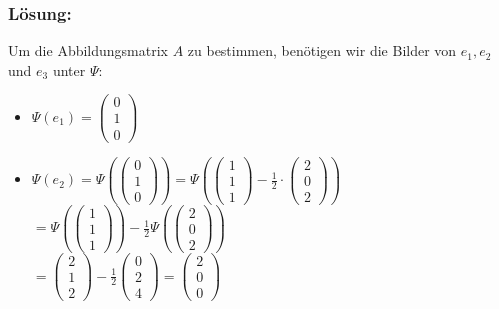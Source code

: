 \begin{frame}\frametitle{Lösung:}
%
Um die Abbildungsmatrix $A$ zu bestimmen, benötigen wir die Bilder von $e_1,e_2$ und $e_3$ unter $\Psi$:

\begin{itemize}

\item $\Psi(e_1)=\begin{pmatrix} 0 \\ 1 \\ 0\end{pmatrix}$
	
\item $\Psi(e_2)=\Psi(\begin{pmatrix} 0 \\ 1\\0\end{pmatrix})=\Psi(\begin{pmatrix}1\\1\\1 \end{pmatrix}-\frac{1}{2}\cdot \begin{pmatrix} 2\\0\\2\end{pmatrix})$\\\hspace{10,5mm}$=\Psi(\begin{pmatrix}1\\1\\1 \end{pmatrix})-\frac{1}{2}\Psi(\begin{pmatrix} 2\\0\\2\end{pmatrix})$\\\hspace{10,5mm}$=\begin{pmatrix}2 \\ 1 \\ 2 \end{pmatrix}-\frac{1}{2} \begin{pmatrix}0\\2\\4 \end{pmatrix}= \begin{pmatrix}2\\0\\0\end{pmatrix}$

\end{itemize}

\end{frame}

